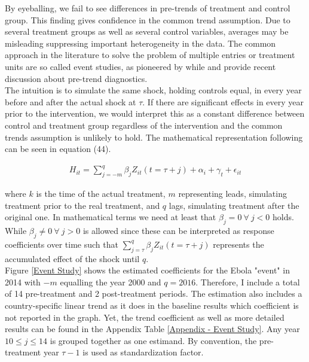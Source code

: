 \documentclass{article}
\begin{document}
By eyeballing, we fail to see differences in pre-trends of treatment and control group. This finding gives confidence in the common trend assumption. Due to several treatment groups as well as several control variables, averages may be misleading suppressing important heterogeneity in the data. The common approach in the literature to solve the problem of multiple entries or treatment units are so called event studies, as pioneered by \cite{bertrand2004much} while \cite{freyal2018pre} and
\cite{borusyak2017revisiting} provide recent discussion about pre-trend diagnostics. \\
The intuition is to simulate the same shock, holding controls equal, in every year before and after the actual shock at $\tau$. If there are significant effects in every year prior to the intervention, we would interpret this as a constant difference between control and treatment group regardless of the intervention and the common trends assumption is unlikely to hold. The mathematical representation following \cite{pischke2005empirical} can be seen in equation (44).

\begin{align}
H_{it} =  \sum_{j=-m}^q \beta_j Z_{it}(t = \tau + j) + \alpha_i + \gamma_t + \epsilon_{it}
\end{align}

where $k$ is the time of the actual treatment, $m$ representing leads, simulating treatment prior to the real treatment, and $q$ lags, simulating treatment after the original one. In mathematical terms we need at least that $\beta_j = 0 \ \forall \ j < 0$ holds. While $\beta_j \neq 0 \ \forall \ j > 0$ is allowed since these can be interpreted as response coefficients over time such that $\sum_{j= \tau}^q \beta_j Z_{it}(t = \tau + j)$ represents the accumulated effect of the shock until $q$. \\
Figure \ref{Event Study} shows the estimated coefficients for the Ebola "event" in 2014 with $-m$ equalling the year 2000 and $q = 2016$. Therefore, I include a total of 14 pre-treatment and 2 post-treatment periods. The estimation also includes a country-specific linear trend as it does in the baseline results which coefficient is not reported in the graph. Yet, the trend coefficient as well as more detailed results can be found in the Appendix Table \ref{Appendix - Event Study}. Any year $10 \leqslant j \leqslant 14 $ is grouped together as one estimand. By convention, the pre-treatment year $\tau - 1$ is used as standardization factor.
\end{document}

